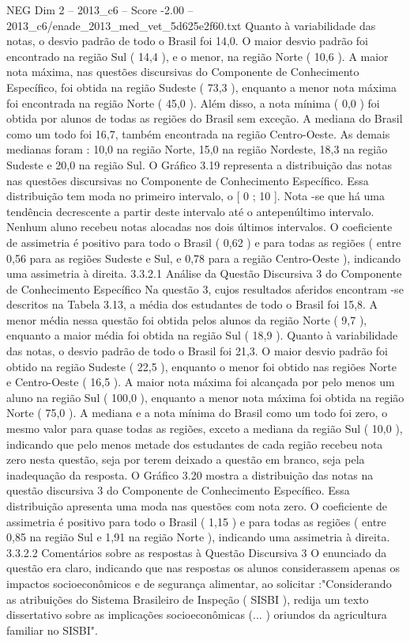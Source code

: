 \begin{textsample}{NEG Dim 2 – 2013\_c6 – Score -2.00 – 2013\_c6/enade\_2013\_med\_vet\_5d625e2f60.txt}
Quanto à variabilidade das notas, o desvio padrão de todo o Brasil foi 14,0.
O maior desvio padrão foi encontrado na região Sul ( 14,4 ), e o menor, na região Norte ( 10,6 ).
A maior nota máxima, nas questões discursivas do Componente de Conhecimento Específico, foi obtida na região Sudeste ( 73,3 ), enquanto a menor nota máxima foi encontrada na região Norte ( 45,0 ).
Além disso, a nota mínima ( 0,0 ) foi obtida por alunos de todas as regiões do Brasil sem exceção.
A mediana do Brasil como um todo foi 16,7, também encontrada na região Centro-Oeste.
As demais medianas foram : 10,0 na região Norte, 15,0 na região Nordeste, 18,3 na região Sudeste e 20,0 na região Sul.
O Gráfico 3.19 representa a distribuição das notas nas questões discursivas no Componente de Conhecimento Específico.
Essa distribuição tem moda no primeiro intervalo, o [ 0 ; 10 ].
Nota -se que há uma tendência decrescente a partir deste intervalo até o antepenúltimo intervalo.
Nenhum aluno recebeu notas alocadas nos dois últimos intervalos.
O coeficiente de assimetria é positivo para todo o Brasil ( 0,62 ) e para todas as regiões ( entre 0,56 para as regiões Sudeste e Sul, e 0,78 para a região Centro-Oeste ), indicando uma assimetria à direita. 3.3.2.1 Análise da Questão Discursiva 3 do Componente de Conhecimento Específico Na questão 3, cujos resultados aferidos encontram -se descritos na Tabela 3.13, a média dos estudantes de todo o Brasil foi 15,8.
A menor média nessa questão foi obtida pelos alunos da região Norte ( 9,7 ), enquanto a maior média foi obtida na região Sul ( 18,9 ).
Quanto à variabilidade das notas, o desvio padrão de todo o Brasil foi 21,3.
O maior desvio padrão foi obtido na região Sudeste ( 22,5 ), enquanto o menor foi obtido nas regiões Norte e Centro-Oeste ( 16,5 ).
A maior nota máxima foi alcançada por pelo menos um aluno na região Sul ( 100,0 ), enquanto a menor nota máxima foi obtida na região Norte ( 75,0 ).
A mediana e a nota mínima do Brasil como um todo foi zero, o mesmo valor para quase todas as regiões, exceto a mediana da região Sul ( 10,0 ), indicando que pelo menos metade dos estudantes de cada região recebeu nota zero nesta questão, seja por terem deixado a questão em branco, seja pela inadequação da resposta.
O Gráfico 3.20 mostra a distribuição das notas na questão discursiva 3 do Componente de Conhecimento Específico.
Essa distribuição apresenta uma moda nas questões com nota zero.
O coeficiente de assimetria é positivo para todo o Brasil ( 1,15 ) e para todas as regiões ( entre 0,85 na região Sul e 1,91 na região Norte ), indicando uma assimetria à direita. 3.3.2.2 Comentários sobre as respostas à Questão Discursiva 3 O enunciado da questão era claro, indicando que nas respostas os alunos considerassem apenas os impactos socioeconômicos e de segurança alimentar, ao solicitar :"Considerando as atribuições do Sistema Brasileiro de Inspeção ( SISBI ), redija um texto dissertativo sobre as implicações socioeconômicas (... ) oriundos da agricultura familiar no SISBI".

\end{textsample}
